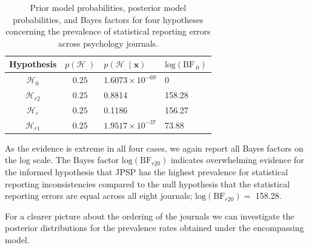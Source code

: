\documentclass[
  english,
  man,floatsintext]{apa6}
\newenvironment{Shaded}{\begin{snugshade}}{\end{snugshade}}
\newcommand{\KeywordTok}[1]{\textcolor[rgb]{0.13,0.29,0.53}{\textbf{#1}}}
\newcommand{\NormalTok}[1]{#1}
\newcommand{\OperatorTok}[1]{\textcolor[rgb]{0.81,0.36,0.00}{\textbf{#1}}}
\newcommand{\StringTok}[1]{\textcolor[rgb]{0.31,0.60,0.02}{#1}}
\begin{document}
\begin{Shaded}
\end{Shaded}

\begin{table}[H]
    \centering
    \caption{Prior model probabilities, posterior model probabilities, and Bayes factors for four hypotheses concerning the prevalence of statistical reporting errors across psychology journals.}
    \begin{tabular}{ccll}
        \hline Hypothesis & $p(\mathcal{H}_{.})$ & $p(\mathcal{H}_{.} \mid \mathbf{x})$ & $\text{log}(\text{BF}_{.0})$ \\
        \hline
        $\mathcal{H}_{0}$  & $0.25$ & 
        $1.6073 \times 10^{-69}$ & 
        $0$ \\
        $\mathcal{H}_{r2}$ & $0.25$ & 
        0.8814 &  
        158.28\\
        $\mathcal{H}_{e}$  &  $0.25$  & 
        0.1186 & 
        156.27 \\
        $\mathcal{H}_{r1}$  &  $0.25$  & 
        $1.9517 \times 10^{-37}$ & 
        73.88 \\
        \hline
    \end{tabular}
    \label{Tab:journalsResults}
\end{table}

\noindent As the evidence is extreme in all four cases, we again report all Bayes factors on the log scale. The Bayes factor \(\text{log}(\text{BF}_{r20})\) indicates overwhelming evidence for the informed hypothesis that JPSP has the highest prevalence for statistical reporting inconsistencies compared to the null hypothesis that the statistical reporting errors are equal across all eight journals; \(\text{log}(\text{BF}_{r20}) =\) 158.28.

For a clearer picture about the ordering of the journals we can investigate the posterior distributions for the prevalence rates obtained under the encompassing model.
\end{document}
